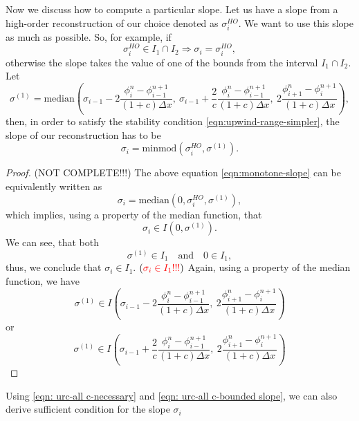 \documentclass[../thesis.tex]{subfiles}
\begin{document}
Now we discuss how to compute a particular slope. Let us have a slope from a high-order reconstruction of our choice denoted as \(\sigma_{i}^{HO}\). We want to use this slope as much as possible. So, for example, if
\begin{equation}
    \sigma_{i}^{HO} \in I_{1} \cap I_{2}
    \Rightarrow
    \sigma_{i} = \sigma_{i}^{HO},
\end{equation}
otherwise the slope takes the value of one of the bounds from the interval \(I_{1} \cap I_{2}\).
Let
\begin{equation}
    \sigma^{(1)}
    = \mbox{median}\left(
        \sigma_{i-1}
        -2\frac{\phi_{i}^{n} - \phi_{i-1}^{n+1}}
        {(1+c)\Delta x},
        ~\sigma_{i-1}
        +\frac{2}{c}
        \frac{\phi_{i}^{n} - \phi_{i-1}^{n+1}}
        {(1+c)\Delta x},
        ~2\frac{\phi_{i+1}^{n} - \phi_{i}^{n+1}}{(1+c)\Delta x}
    \right),
\end{equation}
then, in order to satisfy the stability condition \eqref{eqn:upwind-range-simpler}, the slope of our reconstruction has to be
\begin{equation}
    \label{eqn:monotone-slope}
    \sigma_{i} = \mbox{minmod}\left(
        \sigma_{i}^{HO},\sigma^{(1)}
    \right).
\end{equation}
\begin{proof}
    (NOT COMPLETE!!!)
    The above equation \eqref{eqn:monotone-slope} can be equivalently written as
    \[
        \sigma_{i} = \mbox{median}\left(
            0,\sigma_{i}^{HO},\sigma^{(1)}
        \right),
    \]
    which implies, using a property of the median function, that
    \[\sigma_{i} \in I(0,\sigma^{(1)}).\]
    We can see, that both
    \[
        \sigma^{(1)} \in I_{1} \quad \text{and}\quad
        0 \in I_{1},
    \]
    thus, we conclude that \(\sigma_{i} \in I_{1}\).
    \((\textcolor{red}{\sigma_{i} \in I_{1}!!!})\)
    Again, using a property of the median function,
    we have
    \[
        \sigma^{(1)}
        \in
        I\left(
        \sigma_{i-1}
        -2\frac{\phi_{i}^{n} - \phi_{i-1}^{n+1}}
        {(1+c)\Delta x},
        ~2\frac{\phi_{i+1}^{n} - \phi_{i}^{n+1}}{(1+c)\Delta x}
        \right)
    \]
    or
    \[
        \sigma^{(1)}
        \in
        I\left(
        \sigma_{i-1}
        +\frac{2}{c}
        \frac{\phi_{i}^{n} - \phi_{i-1}^{n+1}}
        {(1+c)\Delta x},
        ~2\frac{\phi_{i+1}^{n} - \phi_{i}^{n+1}}{(1+c)\Delta x}
        \right)
    \]
\end{proof}
Using \eqref{eqn: urc-all c-necessary} and \eqref{eqn: urc-all c-bounded slope}, we can also derive sufficient condition for the slope \(\sigma_{i}\)
\end{document}
